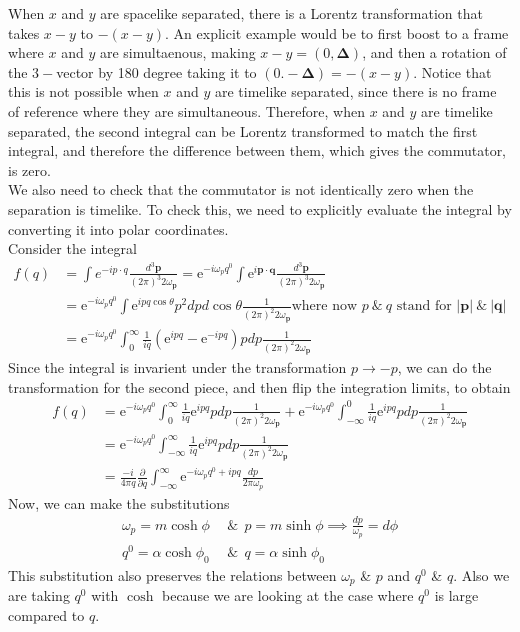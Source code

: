 \documentclass[11pt]{article}
\newcommand{\del}{\partial}
\newcommand{\e}{\mathrm{e}}
\newcommand{\w}{\omega}
\numberwithin{equation}{section}
\begin{document}
    When \(x\) and \(y\) are spacelike separated, there is a Lorentz transformation that takes \(x-y\) to \(-(x-y)\). An explicit example would be to first boost to a frame where \(x\) and \(y\) are simultaenous, making \(x-y = (0, \mathbf{\Delta})\), and then a rotation of the \(3-\)vector by 180 degree taking it to \((0.-\mathbf{\Delta}) = -(x-y)\). Notice that this is not possible when \(x\) and \(y\) are timelike separated, since there is no frame of reference where they are simultaneous. Therefore, when \(x\) and \(y\) are timelike separated, the second integral can be Lorentz transformed to match the first integral, and therefore the difference between them, which gives the commutator, is zero.\\

    We also need to check that the commutator is not identically zero when the separation is timelike. To check this, we need to explicitly evaluate the integral by converting it into polar coordinates.  \\
    Consider the integral 
    \begin{align*}
        f(q) &= \int e^{-ip\cdot q} \frac{d^3\textbf{p}}{(2\pi)^3{2\w_\textbf{p}}} = \e^{-i\w_p q^0} \int \e^{i\textbf{p}\cdot \textbf{q}} \frac{d^3\textbf{p}}{(2\pi)^3{2\w_\textbf{p}}}\\
        &= \e^{-i\w_p q^0} \int \e^{ipq\cos\theta} p^2 dp d\cos\theta\frac{1}{(2\pi)^2{2\w_\textbf{p}}} \text{where now }p~\&~q\text{ stand for } |\textbf{p}|~\&~|\textbf{q}|\\
        &= \e^{-i\w_p q^0}\int_0^\infty \frac{1}{iq}\left(  \e^{ipq} - \e^{-ipq}  \right) pdp \frac{1}{(2\pi)^2{2\w_\textbf{p}}}
    \end{align*}
    Since the integral is invarient under the transformation \(p\to-p\), we can do the transformation for the second piece, and then flip the integration limits, to obtain 
    \begin{align*}
        f(q) &= \e^{-i\w_p q^0}\int_0^\infty \frac{1}{iq} \e^{ipq} pdp \frac{1}{(2\pi)^2{2\w_\textbf{p}}} + \e^{-i\w_p q^0}\int_{-\infty}^0 \frac{1}{iq} \e^{ipq} pdp \frac{1}{(2\pi)^2{2\w_\textbf{p}}}\\
        &=\e^{-i\w_p q^0}\int_{-\infty}^\infty \frac{1}{iq} \e^{ipq} pdp \frac{1}{(2\pi)^2{2\w_\textbf{p}}}\\
        &= \frac{-i}{4\pi q} \frac{\del}{\del q} \int_{-\infty}^{\infty} \e^{-i\w_p q^0+ipq} \frac{dp}{2\pi\w_p} 
    \end{align*}
    Now, we can make the substitutions 
    \begin{align*}
        \w_p = m\cosh\phi ~~&\&~~ p = m\sinh \phi \implies \frac{dp}{\w_p} = d\phi\\
        q^0 = \alpha \cosh\phi_0 ~~&\&~~ q = \alpha\sinh \phi_0 
    \end{align*}
    This substitution also preserves the relations between \(\w_p\) \& \(p\) and \(q^0\) \& \(q\). Also we are taking \(q^0\) with \(\cosh\) because we are looking at the case where \(q^0\) is large compared to \(q\).\\
\end{document}

